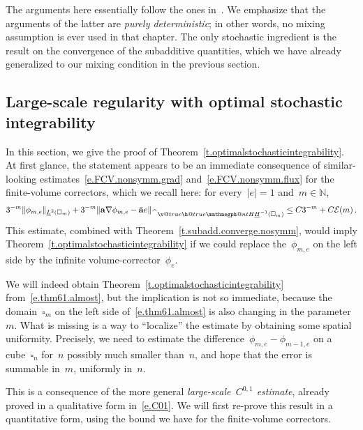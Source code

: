 \documentclass[11pt,twoside]{article} %
\makeatletter
\let\oldsquare\square %
\renewcommand{\square}{\oldsquare}
\numberwithin{equation}{section}
\theoremstyle{definition}
\newcommand*{\N}{\ensuremath{\mathbb{N}}}
\renewcommand*{\hat}{\widehat}
\renewcommand{\a}{\mathbf{a}}
\newcommand{\ahom}{\bar{\a}}
\newcommand{\cu}{\square}
\newcommand{\negphantom}{\v@true\h@true\negph@nt}
\newcommand{\negph@nt}{\ifmmode\expandafter\mathpalette 
  \expandafter\mathnegph@nt\else\expandafter\makenegph@nt\fi}
\newcommand{\makenegph@nt}[1]{%
  \setbox\z@\hbox{\color@begingroup#1\color@endgroup}\finnegph@nt}
\newcommand{\finnegph@nt}{%
  \setbox\tw@\null 
  \ifv@ \ht\tw@\ht\z@\dp\tw@\dp\z@\fi \ifh@\wd\tw@-\wd\z@\fi\box\tw@}
\newcommand{\mathnegph@nt}[2]{%
  \setbox\z@\hbox{$\m@th #1{#2}$}\finnegph@nt}
\newcommand{\Hminusul}{\hat{\phantom{H}}\negphantom{H}\underline{H}^{-1}}
\makeatother
\begin{document}
The arguments here essentially follow the ones in~\cite[Chapter 3]{AKMBook}. We emphasize that the arguments of the latter are \emph{purely deterministic}; in other words, no mixing assumption is ever used in that chapter. The only stochastic ingredient is the result on the convergence of the subadditive quantities, which we have already generalized to our mixing condition in the previous section. 












\subsection{Large-scale regularity with optimal stochastic integrability}
\label{ss.C01}

In this section, we give the proof of Theorem~\ref{t.optimalstochasticintegrability}. At first glance, the statement appears to be an immediate consequence of similar-looking estimates~\eqref{e.FCV.nonsymm.grad} and~\eqref{e.FCV.nonsymm.flux} for the finite-volume correctors, which we recall here: for every~$|e|=1$ and~$m\in\N$, 
\begin{equation}
\label{e.thm61.almost}
3^{-m} \| \phi_{m,e} \|_{\underline{L}^2(\cu_m)} 
+
3^{-m} \| \a \nabla\phi_{m,e} - \ahom e \|_{\Hminusul(\cu_m)} 
\leq
C3^{-m} 
+ 
C\mathcal{E}(m)
\,.
\end{equation}
This estimate, combined with Theorem~\ref{t.subadd.converge.nosymm}, would imply Theorem~\ref{t.optimalstochasticintegrability} if we could replace the~$\phi_{m,e}$ on the left side by the infinite volume-corrector~$\phi_{e}$. 

\smallskip

We will indeed obtain Theorem~\ref{t.optimalstochasticintegrability} from~\eqref{e.thm61.almost}, but the implication is not so immediate, because the domain~$\cu_m$ on the left side of~\eqref{e.thm61.almost} is also changing in the parameter~$m$. What is missing is a way to ``localize'' the estimate by obtaining some spatial uniformity. Precisely, we need to estimate the difference~$\phi_{m,e} - \phi_{m-1,e}$ on a cube~$\cu_n$ for~$n$ possibly much smaller than~$n$, and hope that the error is summable in~$m$, uniformly in~$n$. 

\smallskip

This is a consequence of the more general \emph{large-scale~$C^{0,1}$ estimate}, already proved in a qualitative form in~\eqref{e.C01}. We will first re-prove this result in a quantitative form, using the bound we have for the finite-volume correctors.
\end{document}
